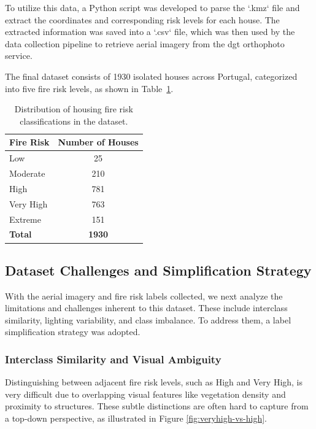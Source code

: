 To utilize this data, a Python script was developed to parse the `.kmz` file and extract the 
coordinates and corresponding risk levels for each house. The extracted information was saved 
into a `.csv` file, which was then used by the data collection pipeline to retrieve aerial 
imagery from the \gls{dgt} orthophoto service.

The final dataset consists of 1930 isolated houses across Portugal, categorized into five fire 
risk levels, as shown in Table~\ref{fig:data-distribution}.

\begin{table}[ht]
    \centering
    \renewcommand{\arraystretch}{1.2}
    \setlength{\tabcolsep}{12pt}
    \begin{tabular}{lc}
        \toprule
        \textbf{Fire Risk} & \textbf{Number of Houses} \\ 
        \midrule
        Low                &  25   \\ 
        Moderate           &  210  \\ 
        High               &  781  \\ 
        Very High          &  763  \\ 
        Extreme            &  151  \\ 
        \midrule
        \textbf{Total}     & \textbf{1930} \\ 
        \bottomrule
    \end{tabular}
    \caption{Distribution of housing fire risk classifications in the dataset.}
    \label{fig:data-distribution}
\end{table}
\subsection{Dataset Challenges and Simplification Strategy}

With the aerial imagery and fire risk labels collected, we next analyze the 
limitations and challenges inherent to this dataset.
These include interclass similarity, lighting variability, and 
class imbalance. To address them, a label simplification strategy 
was adopted.

\subsubsection*{Interclass Similarity and Visual Ambiguity}

Distinguishing between adjacent fire risk levels, such as High and Very High, is 
very difficult due to overlapping visual features like vegetation density and 
proximity to structures. These subtle distinctions are often hard to capture 
from a top-down perspective, as illustrated in Figure \ref{fig:veryhigh-vs-high}.

